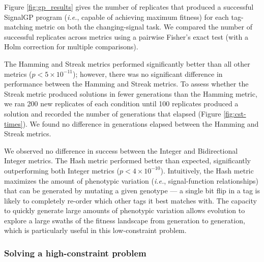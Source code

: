 

Figure \ref{fig:gp_results} gives the number of replicates that produced a successful SignalGP program (\textit{i.e.}, capable of achieving maximum fitness) for each tag-matching metric on both the changing-signal task.
We compared the number of successful replicates across metrics using a pairwise Fisher's exact test (with a Holm correction for multiple comparisons).

The Hamming and Streak metrics performed significantly better than all other metrics ($p < 5\times10^{-11}$); however, there was no significant difference in performance between the Hamming and Streak metrics.
To assess whether the Streak metric produced solutions in fewer generations than the Hamming metric, we ran 200 new replicates of each condition until 100 replicates produced a solution and recorded the number of generations that elapsed (Figure \ref{fig:cst-times}).
We found no difference in generations elapsed between the Hamming and Streak metrics.

We observed no difference in success between the Integer and Bidirectional Integer metrics.
The Hash metric performed better than expected, significantly outperforming both Integer metrics ($p < 4\times10^{-10}$).
Intuitively, the Hash metric maximizes the amount of phenotypic variation (\textit{i.e.}, signal-function relationships) that can be generated by mutating a given genotype --- a single bit flip in a tag is likely to completely re-order which other tags it best matches with.
The capacity to quickly generate large amounts of phenotypic variation allows evolution to explore a large swaths of the fitness landscape from generation to generation, which is particularly useful in this low-constraint problem.

\subsubsection{Solving a high-constraint problem}


